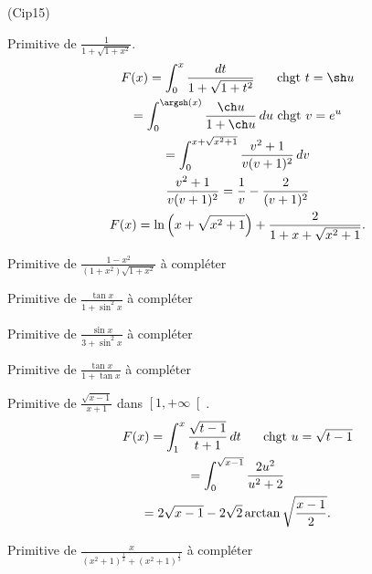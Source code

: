 \begin{tiny}(Cip15)\end{tiny}\newline
Primitive de $\frac{1}{1+\sqrt{1+x^2}}$.
\begin{multline*}
 F(x) = \int_{0}^{x}\frac{dt}{1+\sqrt{1+t^2}}\hspace{0.5cm} \text{ chgt } t = \sh u \\
 = \int_0^{\argsh(x)}\frac{\ch u}{1 + \ch u}\, du \text{ chgt } v = e^u \\
 = \int_0^{x + \sqrt{x^2 + 1}}\frac{v^2 + 1 }{v(v+1)^2}\, dv\\
\frac{v^2 + 1 }{v(v+1)^2} = \frac{1}{v} - \frac{2}{(v+1)^2} \\
F(x) = \ln\left( x + \sqrt{x^2 + 1} \right) + \frac{2}{1 + x + \sqrt{x^2 + 1}} .
\end{multline*}

Primitive de $\frac{1-x^{2}}{(1+x^{2})\sqrt{1+x^{2}}}$ à compléter

Primitive de $\frac{\tan x}{1+\sin ^{2}x}$ à compléter

Primitive de $\frac{\sin x}{3+\sin ^{2}x}$ à compléter

Primitive de $\frac{\tan x}{1+\tan x}$ à compléter

Primitive de $\frac{\sqrt{x-1}}{x+1}$ dans $\left[ 1, +\infty \right[$.
\begin{multline*}
 F(x) = \int_{1}^{x}\frac{\sqrt{t-1}}{t+1}\,dt \hspace{0.5cm} \text{ chgt } u = \sqrt{t - 1} \\
  = \int_0^{\sqrt{x - 1}}\frac{2u^2}{u^2 + 2} \\
  = 2\sqrt{x - 1} - 2\sqrt{2}\arctan \sqrt{\frac{x-1}{2}}.
\end{multline*}


Primitive de $\frac{x}{(x^{2}+1)^{\frac{1}{2}}+(x^{2}+1)^{\frac{1}{3}}}$ à compléter
